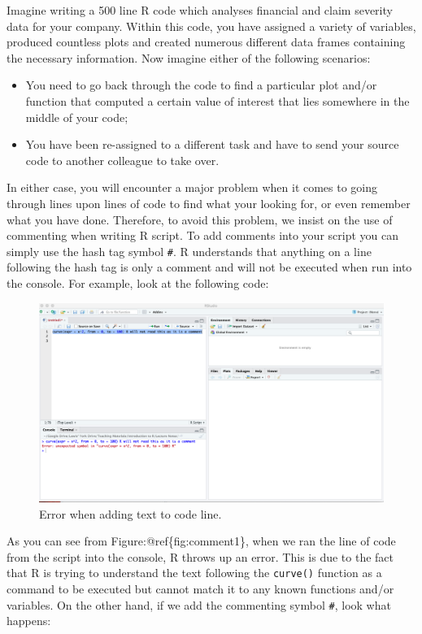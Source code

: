 \documentclass[
]{book}
\providecommand{\tightlist}{%
  \setlength{\itemsep}{0pt}\setlength{\parskip}{0pt}}
\theoremstyle{definition}
\theoremstyle{definition}
\theoremstyle{definition}
\theoremstyle{definition}
\theoremstyle{remark}
\begin{document}
Imagine writing a 500 line R code which analyses financial and claim severity data for your company. Within this code, you have assigned a variety of variables, produced countless plots and created numerous different data frames containing the necessary information. Now imagine either of the following scenarios:

\begin{itemize}
\tightlist
\item
  You need to go back through the code to find a particular plot and/or function that computed a certain value of interest that lies somewhere in the middle of your code;
\item
  You have been re-assigned to a different task and have to send your source code to another colleague to take over.
\end{itemize}

In either case, you will encounter a major problem when it comes to going through lines upon lines of code to find what your looking for, or even remember what you have done. Therefore, to avoid this problem, we insist on the use of commenting when writing R script. To add comments into your script you can simply use the hash tag symbol \texttt{\#}. R understands that anything on a line following the hash tag is only a comment and will not be executed when run into the console. For example, look at the following code:

\begin{figure}

{\centering \includegraphics[width=0.7\linewidth]{Figures/commenting2} 

}

\caption{Error when adding text to code line.}\label{fig:comment1}
\end{figure}

As you can see from Figure:@ref\{fig:comment1\}, when we ran the line of code from the script into the console, R throws up an error. This is due to the fact that R is trying to understand the text following the \texttt{curve()} function as a command to be executed but cannot match it to any known functions and/or variables. On the other hand, if we add the commenting symbol \texttt{\#}, look what happens:
\end{document}
